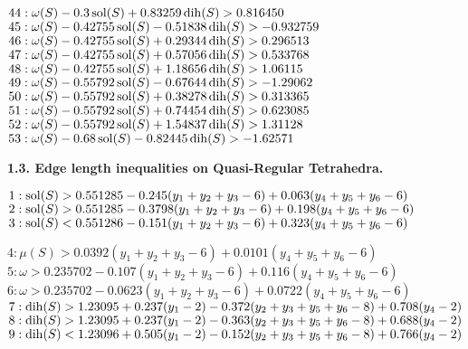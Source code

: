 $44:  \omega(S) - 0.3 \operatorname{sol}(S) + 0.83259 \operatorname{dih}(S) > 0.816450$\newline
$45:  \omega(S) - 0.42755 \operatorname{sol}(S) - 0.51838 \operatorname{dih}(S) > -0.932759$\newline
$46:  \omega(S) - 0.42755 \operatorname{sol}(S) + 0.29344 \operatorname{dih}(S) > 0.296513$\newline
$47:  \omega(S) - 0.42755 \operatorname{sol}(S) + 0.57056 \operatorname{dih}(S) > 0.533768$\newline
$48:  \omega(S) - 0.42755 \operatorname{sol}(S) + 1.18656 \operatorname{dih}(S) > 1.06115$\newline
$49:  \omega(S) - 0.55792 \operatorname{sol}(S) - 0.67644 \operatorname{dih}(S) > -1.29062$\newline
$50:  \omega(S) - 0.55792 \operatorname{sol}(S) + 0.38278 \operatorname{dih}(S) > 0.313365$\newline
$51:  \omega(S) - 0.55792 \operatorname{sol}(S) + 0.74454 \operatorname{dih}(S) > 0.623085$\newline
$52:  \omega(S) - 0.55792 \operatorname{sol}(S) + 1.54837 \operatorname{dih}(S) > 1.31128$\newline
$53:  \omega(S) - 0.68 \operatorname{sol}(S) - 0.82445 \operatorname{dih}(S) > -1.62571$\newline
\smallskip

{\bf 1.3. Edge length inequalities on Quasi-Regular Tetrahedra.}

\smallskip

$1: \operatorname{sol}(S) > 0.551285 - 0.245 (y_1+y_2+y_3-6) + 0.063 (y_4+y_5+y_6-6)$\newline
$2: \operatorname{sol}(S) > 0.551285 - 0.3798 (y_1+y_2+y_3-6) + 0.198 (y_4+y_5+y_6-6)$\newline
$3: \operatorname{sol}(S) < 0.551286 - 0.151 (y_1+y_2+y_3-6) + 0.323 (y_4+y_5+y_6-6)$\newline

$4: \mu(S) > 0.0392 (y_1+y_2+y_3-6) + 0.0101 (y_4+y_5+y_6-6) $\newline
$5: \omega > 0.235702 -0.107 (y_1+y_2+y_3-6) + 0.116 (y_4+y_5+y_6-6)$\newline
$6: \omega > 0.235702 -0.0623 (y_1+y_2+y_3-6) + 0.0722 (y_4+y_5+y_6-6)$\newline
$7: \operatorname{dih}(S) > 1.23095 + 0.237 (y_1-2) - 0.372 (y_2+y_3+y_5+y_6-8) + 0.708 (y_4-2) $\newline
$8: \operatorname{dih}(S) > 1.23095 + 0.237 (y_1-2) - 0.363 (y_2+y_3+y_5+y_6-8) + 0.688 (y_4-2)$\newline
$9: \operatorname{dih}(S) < 1.23096 + 0.505 (y_1-2) - 0.152(y_2+y_3+y_5+y_6-8) + 0.766 (y_4-2)$\newline



\smallskip

